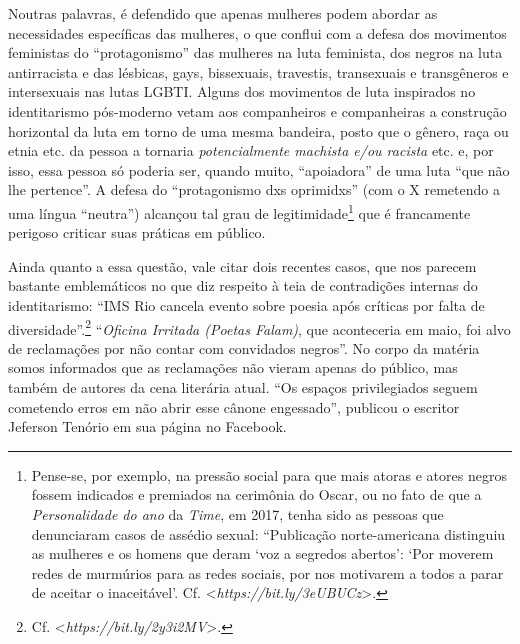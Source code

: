 Noutras palavras, é defendido que apenas mulheres podem abordar as
necessidades específicas das mulheres, o que conflui com a defesa dos
movimentos feministas do ``protagonismo'' das mulheres na luta
feminista, dos negros na luta antirracista e das lésbicas, gays,
bissexuais, travestis, transexuais e transgêneros e intersexuais nas
lutas LGBTI. Alguns dos movimentos de luta inspirados no identitarismo
pós-moderno vetam aos companheiros e companheiras a construção
horizontal da luta em torno de uma mesma bandeira, posto que o gênero,
raça ou etnia etc. da pessoa a tornaria \emph{potencialmente machista
e/ou racista} etc. e, por isso, essa pessoa só poderia ser, quando
muito, ``apoiadora'' de uma luta ``que não lhe pertence''. A defesa do
``protagonismo dxs oprimidxs'' (com o X remetendo a uma língua
``neutra'') alcançou tal grau de legitimidade\footnote{Pense-se, por
  exemplo, na pressão social para que mais atoras e atores negros fossem
  indicados e premiados na cerimônia do Oscar, ou no fato de que a
  \emph{Personalidade do ano} da \emph{Time}, em 2017, tenha sido as
  pessoas que denunciaram casos de assédio sexual: ``Publicação
  norte-americana distinguiu as mulheres e os homens que deram `voz a
  segredos abertos': `Por moverem redes de murmúrios para as redes
  sociais, por nos motivarem a todos a parar de aceitar o inaceitável'.
  Cf. \textless{}\emph{https://bit.ly/3eUBUCz}\textgreater{}.}
que é francamente perigoso criticar suas práticas em público.

Ainda quanto a essa questão, vale citar dois recentes casos, que nos
parecem bastante emblemáticos no que diz respeito à teia de contradições
internas do identitarismo: ``IMS Rio cancela evento sobre poesia após
críticas por falta de diversidade''.\footnote{Cf.
  \textless{}\emph{https://bit.ly/2y3i2MV}\textgreater{}.}
``\emph{Oficina Irritada (Poetas Falam)}, que aconteceria em maio, foi
alvo de reclamações por não contar com convidados negros''. No corpo da
matéria somos informados que as reclamações não vieram apenas do
público, mas também de autores da cena literária atual. ``Os espaços
privilegiados seguem cometendo erros em não abrir esse cânone
engessado'', publicou o escritor Jeferson Tenório em sua página no
Facebook.

